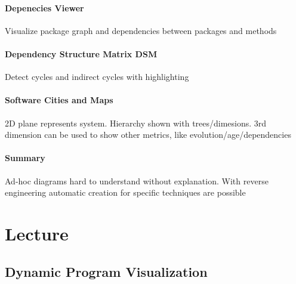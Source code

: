 \documentclass[10pt,a4paper]{article}
\begin{document}
	\paragraph{Depenecies Viewer}
	Visualize package graph and dependencies between packages and methods
	
	\paragraph{Dependency Structure Matrix DSM}
	Detect cycles and indirect cycles with highlighting

	\paragraph{Software Cities and Maps}
	2D plane represents system. Hierarchy shown with trees/dimesions. 3rd dimension can be used to show other metrics, like evolution/age/dependencies
	
	\paragraph{Summary}
	Ad-hoc diagrams hard to understand without explanation. With reverse engineering automatic creation for specific techniques are possible 
	
\section{Lecture}
	\subsection{Dynamic Program Visualization}
		
\end{document}
